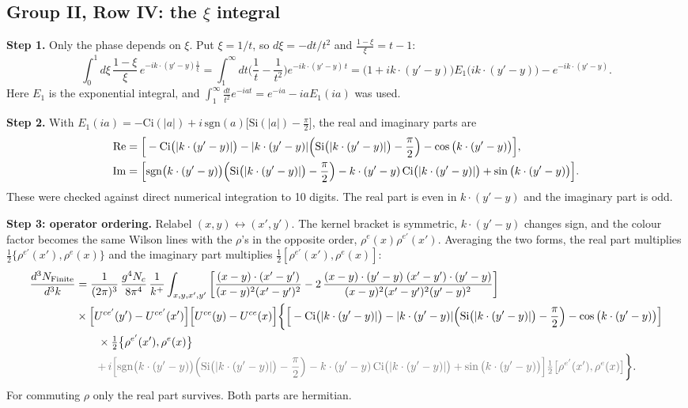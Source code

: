 \documentclass[9pt]{article}
\newcommand{\Gr}[1]{{\color{cX}#1}}
\numberwithin{equation}{section}
\begin{document}
\subsection{Group II, Row IV: the $\xi$ integral}
\textbf{Step 1.} Only the phase depends on $\xi$. Put $\xi=1/t$, so $d\xi=-dt/t^{2}$ and $\frac{1-\xi}{\xi}=t-1$:
\begin{equation}
\int_{0}^{1}d\xi\,\frac{1-\xi}{\xi}\,e^{-ik\cdot(y'-y)\frac{1}{\xi}}=\int_{1}^{\infty}dt\Big(\frac1t-\frac{1}{t^{2}}\Big)e^{-ik\cdot(y'-y)\,t}=\Big(1+ik\cdot(y'-y)\Big)E_{1}\big(ik\cdot(y'-y)\big)-e^{-ik\cdot(y'-y)}.
\end{equation}
Here $E_{1}$ is the exponential integral, and $\int_{1}^{\infty}\frac{dt}{t^{2}}e^{-iat}=e^{-ia}-iaE_{1}(ia)$ was used.

\noindent\textbf{Step 2.} With $E_{1}(ia)=-\mathrm{Ci}(|a|)+i\,\mathrm{sgn}(a)\big[\mathrm{Si}(|a|)-\frac{\pi}{2}\big]$, the real and imaginary parts are
\begin{align}
{\rm Re}&=\Big[-\mathrm{Ci}\big(|k\cdot(y'-y)|\big)-|k\cdot(y'-y)|\Big(\mathrm{Si}\big(|k\cdot(y'-y)|\big)-\frac{\pi}{2}\Big)-\cos\big(k\cdot(y'-y)\big)\Big],\notag\\
{\rm Im}&=\Big[\mathrm{sgn}\big(k\cdot(y'-y)\big)\Big(\mathrm{Si}\big(|k\cdot(y'-y)|\big)-\frac{\pi}{2}\Big)-k\cdot(y'-y)\,\mathrm{Ci}\big(|k\cdot(y'-y)|\big)+\sin\big(k\cdot(y'-y)\big)\Big].
\end{align}
These were checked against direct numerical integration to 10 digits. The real part is even in $k\cdot(y'-y)$ and the imaginary part is odd.

\noindent\textbf{Step 3: operator ordering.} Relabel $(x,y)\leftrightarrow(x',y')$. The kernel bracket is symmetric, $k\cdot(y'-y)$ changes sign, and the colour factor becomes the same Wilson lines with the $\rho$'s in the opposite order, $\rho^{e}(x)\rho^{e'}(x')$. Averaging the two forms, the real part multiplies $\frac12\{\rho^{e'}(x'),\rho^{e}(x)\}$ and the imaginary part multiplies $\frac12[\rho^{e'}(x'),\rho^{e}(x)]$:
\begin{align}
\frac{d^{3}N_{\rm Finite}}{d^{3}k}&=\frac{1}{(2\pi)^{3}}\,\frac{g^{4}N_{c}}{8\pi^{4}}\,\frac{1}{k^{+}}\int_{x,y,x',y'}\bigg[\frac{(x-y)\cdot(x'-y')}{(x-y)^{2}(x'-y')^{2}}-2\,\frac{(x-y)\cdot(y'-y)\;(x'-y')\cdot(y'-y)}{(x-y)^{2}(x'-y')^{2}(y'-y)^{2}}\bigg]\notag\\
&\times\Big[U^{ce'}(y')-U^{ce'}(x')\Big]\Big[U^{ce}(y)-U^{ce}(x)\Big]\bigg\{\Big[-\mathrm{Ci}\big(|k\cdot(y'-y)|\big)-|k\cdot(y'-y)|\Big(\mathrm{Si}\big(|k\cdot(y'-y)|\big)-\frac{\pi}{2}\Big)-\cos\big(k\cdot(y'-y)\big)\Big]\notag\\
&\qquad\times\tfrac12\big\{\rho^{e'}(x'),\rho^{e}(x)\big\}\notag\\
&\qquad\Gr{+\,i\Big[\mathrm{sgn}\big(k\cdot(y'-y)\big)\Big(\mathrm{Si}\big(|k\cdot(y'-y)|\big)-\frac{\pi}{2}\Big)-k\cdot(y'-y)\,\mathrm{Ci}\big(|k\cdot(y'-y)|\big)+\sin\big(k\cdot(y'-y)\big)\Big]\tfrac12\big[\rho^{e'}(x'),\rho^{e}(x)\big]}\bigg\}.
\end{align}
For commuting $\rho$ only the real part survives. Both parts are hermitian.
\end{document}
